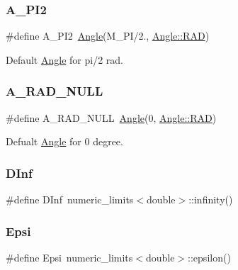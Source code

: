 \subsubsection{\texorpdfstring{A\_PI2}{A\_PI2}}
{\footnotesize\ttfamily \#define A\+\_\+\+P\+I2~\mbox{\hyperlink{class_angle}{Angle}}(M\+\_\+\+PI/2., \mbox{\hyperlink{class_angle_a4f7b9849ce8780bcba95ca3ee45cff77a93ab6b68075fd7a6fe724fbde5b13c1f}{Angle\+::\+R\+AD}})}



Default \mbox{\hyperlink{class_angle}{Angle}} for pi/2 rad. 

\mbox{\label{maths_8hh_a0da7d22251afe9ccf02289e0bceca28f}} 
\subsubsection{\texorpdfstring{A\_RAD\_NULL}{A\_RAD\_NULL}}
{\footnotesize\ttfamily \#define A\+\_\+\+R\+A\+D\+\_\+\+N\+U\+LL~\mbox{\hyperlink{class_angle}{Angle}}(0, \mbox{\hyperlink{class_angle_a4f7b9849ce8780bcba95ca3ee45cff77a93ab6b68075fd7a6fe724fbde5b13c1f}{Angle\+::\+R\+AD}})}



Defualt \mbox{\hyperlink{class_angle}{Angle}} for 0 degree. 

\mbox{\label{maths_8hh_a995779faef78614d4f074b7d444de767}} 
\subsubsection{\texorpdfstring{DInf}{DInf}}
{\footnotesize\ttfamily \#define D\+Inf~numeric\+\_\+limits$<$double$>$\+::infinity()}

\mbox{\label{maths_8hh_a78802b279ab85021d7f6bffe51621703}} 
\subsubsection{\texorpdfstring{Epsi}{Epsi}}
{\footnotesize\ttfamily \#define Epsi~numeric\+\_\+limits$<$double$>$\+::epsilon()}

\mbox{\label{maths_8hh_a2eba794860251c1b30e532df32ee4d1b}} 
